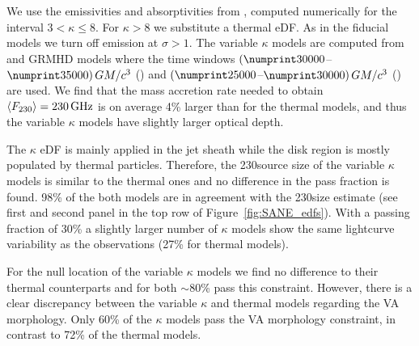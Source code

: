 We use the emissivities and absorptivities from  \cite{2016ApJ...822...34P}, computed numerically for the interval $3 < \kappa \le 8$.
For $\kappa > 8$ we substitute a thermal eDF.
As in the fiducial models we turn off emission at $\sigma > 1$.
The variable $\kappa$ models are computed from \hamr and \bhac GRMHD models where the time windows
$(\no{30000}$--$\no{35000})\,\tg$ (\hamr) and
$(\no{25000}$--$\no{30000})\,\tg$ (\bhac) are used.
We find that the mass accretion rate needed to obtain $\langle F_{230} \rangle = 230\,\mathrm{GHz}$ is on average 4\% larger than for the thermal models, and thus the variable $\kappa$ models have slightly larger optical depth. 


The $\kappa$ eDF is mainly applied in the jet sheath while the disk region is mostly populated by thermal particles.
Therefore, the 230\GHz source size of the variable $\kappa$ models is similar to the thermal ones and no difference in the pass fraction is found.
98\% of the both models are in agreement with the 230\GHz size estimate (see first and second panel in the top row of Figure~\ref{fig:SANE_edfs}).
With a passing fraction of 30\% a slightly larger number of $\kappa$ models show the same lightcurve variability as the observations (27\% for thermal models).


For the null location of the variable $\kappa$ models we find no difference to their thermal counterparts and for both $\sim$80\% pass this constraint.
However, there is a clear discrepancy between the variable $\kappa$ and thermal models regarding the VA morphology.
Only 60\% of the $\kappa$ models pass the VA morphology constraint, in contrast to 72\% of the thermal models.


